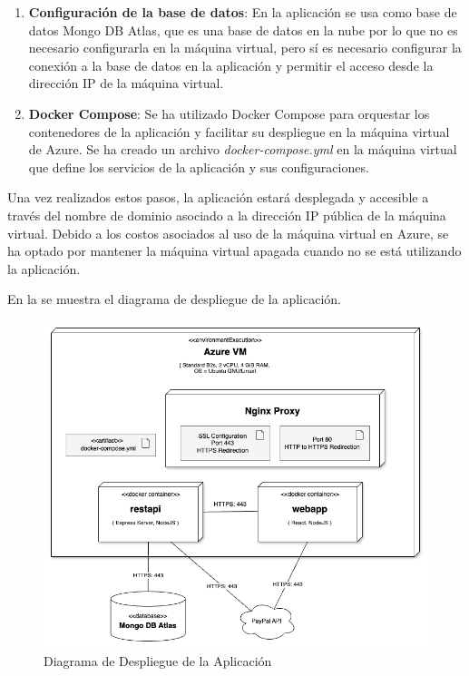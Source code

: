 \begin{enumerate}
    \item \textbf{Configuración de la base de datos}: En la aplicación se usa como base de datos Mongo DB Atlas, que es una base de datos en la nube por lo que no es necesario configurarla en la máquina virtual, 
    pero sí es necesario configurar la conexión a la base de datos en la aplicación y permitir el acceso desde la dirección IP de la máquina virtual.

    \item \textbf{Docker Compose}: Se ha utilizado Docker Compose para orquestar los contenedores de la aplicación y facilitar su despliegue en la máquina virtual de Azure.
    Se ha creado un archivo \textit{docker-compose.yml} en la máquina virtual que define los servicios de la aplicación y sus configuraciones.

\end{enumerate}

Una vez realizados estos pasos, la aplicación estará desplegada y accesible a través del nombre de dominio asociado a la dirección IP pública de la máquina virtual.
Debido a los costos asociados al uso de la máquina virtual en Azure, se ha optado por mantener la máquina virtual apagada cuando no se está utilizando la aplicación.


En la  se muestra el diagrama de despliegue de la aplicación.
\begin{figure}[H]
    \hypertarget{fig:6_6_Diagrama-Despliegue}{}
    \centering
    \includegraphics[width=0.8\linewidth]{figures/6-Analisis/6-Clases/6_5-Deployment.png}
    \caption{Diagrama de Despliegue de la Aplicación}
    \label{fig:6_6_Diagrama-Despliegue}
\end{figure}
